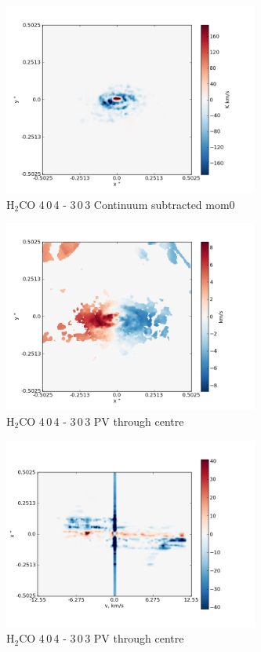 \documentclass[useAMS,usenatbib]{mn2e}
\begin{document}
 
%

\begin{figure}
 \includegraphics[width=84mm]{Figures/sim/imageH2CO_4-0-4->3-0-3_30deg_contSub.png}

 \caption{H$_2$CO 4$\,$0$\,$4 - 3$\,$0$\,$3 Continuum subtracted mom0}
\end{figure}

\begin{figure}
 \includegraphics[width=84mm]{Figures/sim/imageH2CO_4-0-4->3-0-3_30deg_mom1.png}

 \caption{H$_2$CO 4$\,$0$\,$4 - 3$\,$0$\,$3 PV through centre}
\end{figure}

\begin{figure}
 \includegraphics[width=84mm]{Figures/sim/imageH2CO_4-0-4->3-0-3_30deg_PV_centre.png}

 \caption{H$_2$CO 4$\,$0$\,$4 - 3$\,$0$\,$3 PV through centre}
\end{figure}
\end{document}
